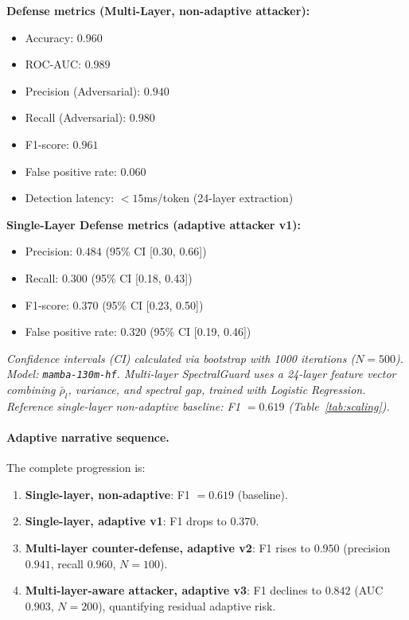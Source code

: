 \documentclass[10pt,twocolumn]{article}
\begin{document}
\textbf{Defense metrics (Multi-Layer, non-adaptive attacker):}
\begin{itemize}
\item Accuracy: $0.960$
\item ROC-AUC: $0.989$
\item Precision (Adversarial): $0.940$
\item Recall (Adversarial): $0.980$
\item F1-score: $0.961$
\item False positive rate: $0.060$
\item Detection latency: $<15$ms/token (24-layer extraction)
\end{itemize}

\textbf{Single-Layer Defense metrics (adaptive attacker v1):}
\begin{itemize}
\item Precision: $0.484$ (95\% CI [0.30, 0.66])
\item Recall: $0.300$ (95\% CI [0.18, 0.43])
\item F1-score: $0.370$ (95\% CI [0.23, 0.50])
\item False positive rate: $0.320$ (95\% CI [0.19, 0.46])
\end{itemize}
\vspace{-0.5em}
\begin{footnotesize}
\textit{Confidence intervals (CI) calculated via bootstrap with 1000 iterations ($N=500$). Model: \texttt{mamba-130m-hf}. Multi-layer SpectralGuard uses a 24-layer feature vector combining $\bar{\rho}_l$, variance, and spectral gap, trained with Logistic Regression. Reference single-layer non-adaptive baseline: F1 $=0.619$ (Table~\ref{tab:scaling}).}
\end{footnotesize}

\paragraph{Adaptive narrative sequence.}
The complete progression is:
\begin{enumerate}
\item \textbf{Single-layer, non-adaptive}: F1 $=0.619$ (baseline).
\item \textbf{Single-layer, adaptive v1}: F1 drops to $0.370$.
\item \textbf{Multi-layer counter-defense, adaptive v2}: F1 rises to $0.950$ (precision $0.941$, recall $0.960$, $N=100$).
\item \textbf{Multi-layer-aware attacker, adaptive v3}: F1 declines to $0.842$ (AUC $0.903$, $N=200$), quantifying residual adaptive risk.
\end{enumerate}
\end{document}
